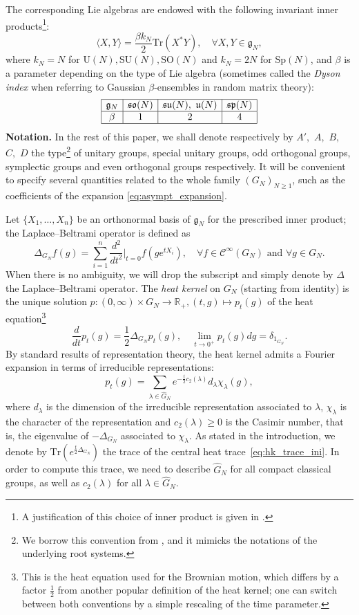 \documentclass[11pt,a4paper,reqno]{article}
\theoremstyle{definition}
\theoremstyle{remark}
\newcommand\SU{{\mathrm{SU}}}
\newcommand\SO{{\mathrm{SO}}}
\newcommand\Sp{{\mathrm{Sp}}}
\newcommand\U{{\mathrm U}}
\newcommand\R{\mathbb{R}}
\newcommand\Tr{\mathrm{Tr}}
\begin{document}
The corresponding Lie algebras are endowed with the following invariant inner products\footnote{A justification of this choice of inner product is given in \cite[\S 2.1.]{DL}.}:
\begin{equation}\label{eq:inner_product}
\langle X,Y\rangle = \frac{\beta k_N}{2}\Tr(X^*Y),\quad \forall X,Y\in\mathfrak{g}_N,
\end{equation}
where $k_N=N$ for $\U(N),\SU(N),\SO(N)$ and $k_N=2N$ for $\Sp(N)$, and $\beta$ is a parameter depending on the type of Lie algebra (sometimes called the \emph{Dyson index} when referring to Gaussian $\beta$-ensembles in random matrix theory):
\[
\begin{array}{|c|c|c|c|}
\hline \mathfrak{g}_N & \mathfrak{so}(N) & \mathfrak{su}(N),\ \mathfrak{u}(N) & \mathfrak{sp}(N)\\
\hline \beta & 1 & 2 & 4\\
\hline
\end{array}
\]
{\bf Notation.} In the rest of this paper, we shall denote respectively by $A',$ $A,$ $B,$ $C,$ $D$ the type\footnote{We borrow this convention from \cite{DL}, and it mimicks the notations of the underlying root systems.} of unitary groups, special unitary groups, odd orthogonal groups, symplectic groups and even orthogonal groups respectively. It will be convenient to specify several quantities related to the whole family $(G_N)_{N\geq 1}$, such as the coefficients of the expansion \eqref{eq:asympt_expansion}.

Let $\{X_1,\ldots,X_n\}$ be an orthonormal basis of $\mathfrak{g}_N$ for the prescribed inner product; the Laplace--Beltrami operator is defined as
\[
\Delta_{G_N}f(g) = \sum_{i=1}^n \frac{d^2}{dt^2}\bigg\vert_{t=0}f(ge^{tX_i}),\quad \forall f\in\mathscr{C}^\infty(G_N) \text{ and } \forall g\in G_N.
\]
When there is no ambiguity, we will drop the subscript and simply denote by $\Delta$ the Laplace--Beltrami operator. The \emph{heat kernel} on $G_N$ (starting from identity) is the unique solution $p:(0,\infty)\times G_N\to\R_+,(t,g)\mapsto p_t(g)$ of the heat equation\footnote{This is the heat equation used for the Brownian motion, which differs by a factor $\frac12$ from another popular definition of the heat kernel; one can switch between both conventions by a simple rescaling of the time parameter.}
\[
\frac{d}{dt}p_t(g)=\frac12\Delta_{G_N} p_t(g), \quad \lim_{t\to 0^+}p_t(g)dg=\delta_{1_{G_N}}.
\]
By standard results of representation theory, the heat kernel admits a Fourier expansion in terms of irreducible representations:
\begin{equation}
p_t(g)=\sum_{\lambda\in\widehat{G}_N}e^{-\frac{t}{2}c_2(\lambda)}d_\lambda\chi_\lambda(g),
\end{equation}
where $d_\lambda$ is the dimension of the irreducible representation associated to $\lambda$, $\chi_\lambda$ is the character of the representation and $c_2(\lambda)\geq 0$ is the Casimir number, that is, the eigenvalue of $-\Delta_{G_N}$ associated to $\chi_\lambda$. As stated in the introduction, we denote by $\Tr(e^{\frac{t}{2}\Delta_{G_N}})$ the trace of the central heat trace~\eqref{eq:hk_trace_ini}. In order to compute this trace, we need to describe $\widehat{G}_N$ for all compact classical groups, as well as $c_2(\lambda)$ for all $\lambda\in\widehat{G}_N$.
\end{document}
